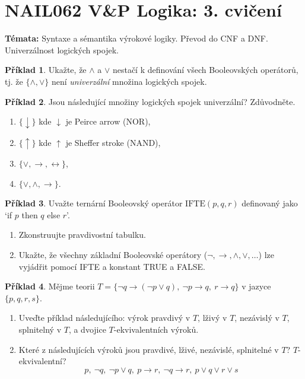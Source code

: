 \documentclass[a4paper]{article}
\theoremstyle{definition}
\newtheorem{problem}{Příklad}
\begin{document}
\section*{NAIL062 V\&P Logika: 3. cvičení}

\textbf{Témata:} 
Syntaxe a sémantika výrokové logiky. Převod do CNF a DNF. Univerzálnost logických spojek.



\medskip\begin{problem}
    Ukažte, že $\wedge$ a $\vee$ nestačí k definování všech Booleovských operátorů, tj. že $\{\wedge,\vee\}$ není \emph{univerzální} množina logických spojek.
    \end{problem}
    
    \medskip\begin{problem} Jsou následující množiny logických spojek univerzální? Zdůvodněte.
    \begin{enumerate}
        \item $\{\downarrow\}$ kde $\downarrow$ je Peirce arrow (NOR),
        \item $\{\uparrow\}$ kde $\uparrow$ je Sheffer stroke (NAND),
        \item $\{\vee, \rightarrow, \leftrightarrow\}$,
        \item $\{\vee, \wedge, \rightarrow\}$.
    \end{enumerate}
    \end{problem}
    
    
    \medskip\begin{problem}
    Uvažte ternární Booleovský operátor $\mathrm{IFTE}(p, q, r)$ definovaný jako `if $p$ then $q$ else $r$'. 
    \begin{enumerate}
        \item Zkonstruujte pravdivostní tabulku.
        \item Ukažte, že všechny základní Booleovské operátory ($\neg, \to, \wedge,\vee,\dots$) lze vyjádřit pomocí IFTE a konstant TRUE a FALSE.
    \end{enumerate}  
    \end{problem}


\medskip\begin{problem}
    Mějme teorii $T=\{\neg q \to (\neg p \vee q),\ \neg p \to q,\ r \to q\}$ v jazyce $\{p, q, r, s\}$.
    \begin{enumerate}
        \item Uveďte příklad následujícího: výrok pravdivý v $T$, lživý v $T$, nezávislý v $T$, splnitelný v $T$, a dvojice $T$-ekvivalentních výroků.
        \item Které z následujících výroků jsou pravdivé, lživé, nezávislé, splnitelné v $T$? $T$-ekvivalentní? 
        $$
        p, \ \neg q, \ \neg p\vee q, \ p\to r,\ \neg q\to r, \ p\vee q\vee r\vee s
        $$
    \end{enumerate}
\end{problem}
    
\end{document}
